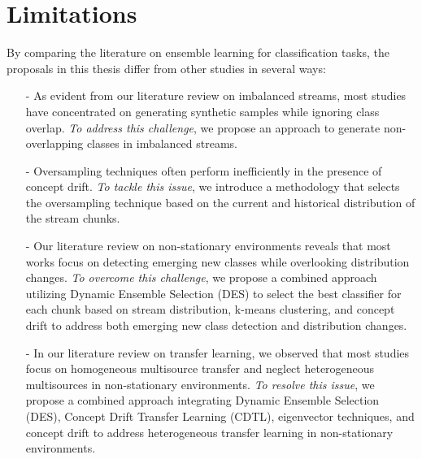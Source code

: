 \section{Limitations} 
\label{sec:3_7_remartks}

By comparing the literature on ensemble learning for classification tasks, the proposals in this thesis differ from other studies in several ways:

\begin{enumerate}
    
    \item [-] As evident from our literature review on imbalanced streams, most studies have concentrated on generating synthetic samples while ignoring class overlap. \textit{To address this challenge}, we propose an approach to generate non-overlapping classes in imbalanced streams.

    \item [-] Oversampling techniques often perform inefficiently in the presence of concept drift. \textit{To tackle this issue}, we introduce a methodology that selects the oversampling technique based on the current and historical distribution of the stream chunks.
    
    \item [-] Our literature review on non-stationary environments reveals that most works focus on detecting emerging new classes while overlooking distribution changes. \textit{To overcome this challenge}, we propose a combined approach utilizing Dynamic Ensemble Selection (DES) to select the best classifier for each chunk based on stream distribution, k-means clustering, and concept drift to address both emerging new class detection and distribution changes.
    
    \item [-] In our literature review on transfer learning, we observed that most studies focus on homogeneous multisource transfer and neglect heterogeneous multisources in non-stationary environments. \textit{To resolve this issue}, we propose a combined approach integrating Dynamic Ensemble Selection (DES), Concept Drift Transfer Learning (CDTL), eigenvector techniques, and concept drift to address heterogeneous transfer learning in non-stationary environments.

\end{enumerate}
